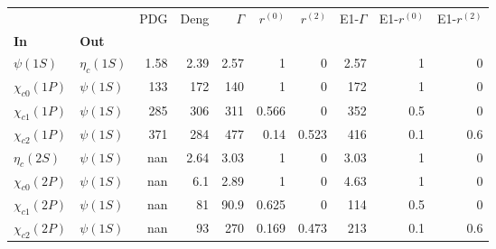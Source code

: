 \begin{tabular}{l|l|r|r|r|r|r|r|r|r}
\toprule
                &            &  PDG &  Deng &  $\Gamma$ &  $r^{(0)}$ &  $r^{(2)}$ &  E1-$\Gamma$ &  E1-$r^{(0)}$ &  E1-$r^{(2)}$ \\
\textbf{In} & \textbf{Out} &      &       &           &            &            &              &               &               \\
\midrule
\textbf{$\psi(1S)$} & \textbf{$\eta_{c}(1S)$} & 1.58 &  2.39 &      2.57 &          1 &          0 &         2.57 &             1 &             0 \\
\textbf{$\chi_{c0}(1P)$} & \textbf{$\psi(1S)$} &  133 &   172 &       140 &          1 &          0 &          172 &             1 &             0 \\
\textbf{$\chi_{c1}(1P)$} & \textbf{$\psi(1S)$} &  285 &   306 &       311 &      0.566 &          0 &          352 &           0.5 &             0 \\
\textbf{$\chi_{c2}(1P)$} & \textbf{$\psi(1S)$} &  371 &   284 &       477 &       0.14 &      0.523 &          416 &           0.1 &           0.6 \\
\textbf{$\eta_{c}(2S)$} & \textbf{$\psi(1S)$} &  nan &  2.64 &      3.03 &          1 &          0 &         3.03 &             1 &             0 \\
\textbf{$\chi_{c0}(2P)$} & \textbf{$\psi(1S)$} &  nan &   6.1 &      2.89 &          1 &          0 &         4.63 &             1 &             0 \\
\textbf{$\chi_{c1}(2P)$} & \textbf{$\psi(1S)$} &  nan &    81 &      90.9 &      0.625 &          0 &          114 &           0.5 &             0 \\
\textbf{$\chi_{c2}(2P)$} & \textbf{$\psi(1S)$} &  nan &    93 &       270 &      0.169 &      0.473 &          213 &           0.1 &           0.6 \\
\bottomrule
\end{tabular}
